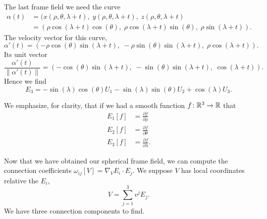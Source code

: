 \M
The last frame field we need the curve
\begin{equation}
\begin{split}
\alpha(t)
  &= (x(\rho,\theta,\lambda + t),\; y(\rho,\theta,\lambda + t),\; z(\rho,\theta,\lambda + t)\\
&= (\rho\cos(\lambda+t)\cos(\theta),\; \rho\cos(\lambda+t)\sin(\theta),\;\rho\sin(\lambda+t)).
\end{split}
\end{equation}
The velocity vector for this curve,
\begin{equation}
\alpha'(t) = (-\rho\cos(\theta)\sin(\lambda+t),\; -\rho\sin(\theta)\sin(\lambda+t),\;
\rho\cos(\lambda+t)).
\end{equation}
Its unit vector
\begin{equation}
\frac{\alpha'(t)}{\|\alpha'(t)\|} = (-\cos(\theta)\sin(\lambda+t),\; -\sin(\theta)\sin(\lambda+t),\;
\cos(\lambda+t)).
\end{equation}
Hence we find
\begin{equation}
E_{3} = -\sin(\lambda)\cos(\theta)U_{1} - \sin(\lambda)\sin(\theta)U_{2}+\cos(\lambda)U_{3}.
\end{equation}

We emphasize, for clarity, that if we had a smooth function
$f\colon\mathbb{R}^{3}\to\mathbb{R}$ that
\begin{subequations}
  \begin{align}
    E_{1}[f] &= \frac{\partial f}{\partial\rho}\\
    E_{2}[f] &= \frac{\partial f}{\partial\theta}\\
    E_{3}[f] &= \frac{\partial f}{\partial\lambda}.
  \end{align}
\end{subequations}

Now that we have obtained our spherical frame field, we can compute the
connection coefficients $\omega_{ij}[V] = \nabla_{V}E_{i}\cdot E_{j}$.
We suppose $V$ has local coordinates relative the $E_{i}$,
\begin{equation}
V = \sum^{3}_{j=1}v^{j}E_{j}.
\end{equation}
We have three connection components to find.

